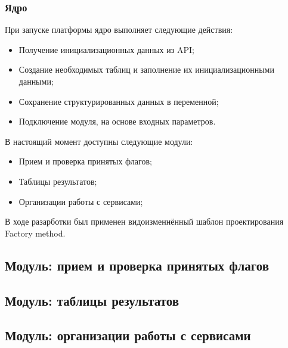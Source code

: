 \subsubsection{Ядро}

При запуске платформы ядро выполняет следующие действия:
\begin{itemize} 
\item Получение инициализационных данных из API;
\item Создание необходимых таблиц и заполнение их инициализационными данными; 
\item Сохранение структурированных данных в переменной;
\item Подключение модуля, на основе входных параметров.
\end{itemize}

В настоящий момент доступны следующие модули:
\begin{itemize} 
\item Прием и проверка принятых флагов;
\item Таблицы результатов; 
\item Организации работы с сервисами;
\end{itemize}

В ходе разарботки был применен видоизменнённый шаблон проектирования Factory method.


\subsection{Модуль: прием и проверка принятых флагов} %


\subsection{Модуль: таблицы результатов} %


\subsection{Модуль: организации работы с сервисами} %


\clearpage
